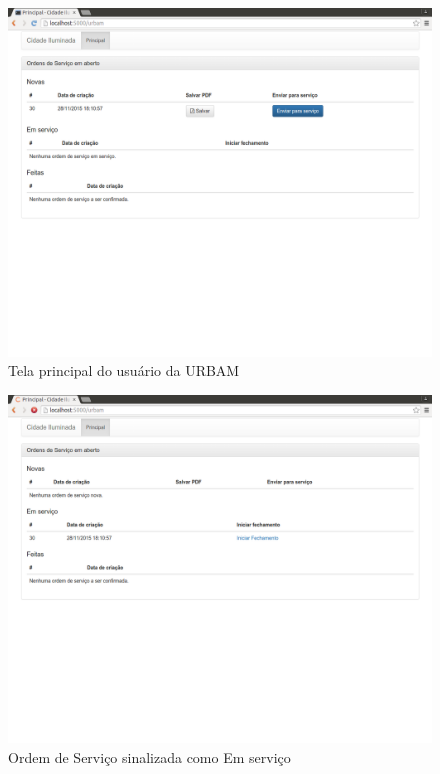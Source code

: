 \documentclass[
	article,			%
	11pt,				%
	oneside,			%
	a4paper,			%
	english,			%
	brazil,				%
	sumario=tradicional
	]{abntex2}
\begin{document}
\begin{figure}[!htbp]
 \centering
 \caption{\label{site-visao-urbam}Tela principal do usuário da URBAM}
 \includegraphics[scale=0.25]{site/13-urbam.png}
\end{figure}

\begin{figure}[!htbp]
 \centering
 \caption{\label{site-servico-os}Ordem de Serviço sinalizada como Em serviço}
 \includegraphics[scale=0.25]{site/14-servico_os.png}
\end{figure}
\end{document}
